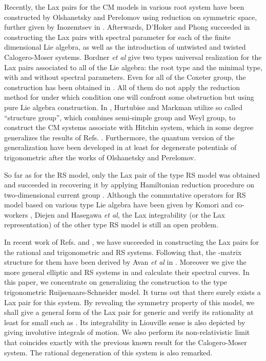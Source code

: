 \documentclass[a4paper,12pt]{article}
\begin{document}
Recently, the Lax pairs for the CM models in various root system have been
constructed by Olshanetsky and Perelomov\cite{op} using reduction on
symmetric space, further given by Inozemtsev in \cite{in}. Afterwards,
D'Hoker and Phong\cite{hp1} succeeded in constructing the Lax pairs with
spectral parameter for each of the finite dimensional Lie algebra, as well
as the introduction of untwisted and twisted Calogero-Moser systems. Bordner
\textit{et al}\cite{bcs,bcs2,bcs3} give two types universal realization for
the Lax pairs associated to all of the Lie algebra: the root type and the
minimal type, with and without spectral parameters. Even for all of the
Coxeter group, the construction has been obtained in \cite{bcs1}. All of
them do not apply the reduction method for under which condition one will
confront some obstruction\cite{hm} but using pure Lie algebra construction.
In \cite{hm}, Hurtubise and Markman utilize so called ``structure group'',
which combines semi-simple group and Weyl group, to construct the CM systems
associate with Hitchin system, which in some degree generalizes the results
of Refs. \cite{hp1,bcs,bcs2,bcs3,bcs1}. Furthermore, the quantum version of
the generalization have been developed in \cite{bms,kps} at least for
degenerate potentials of trigonometric after the works of Olshanetsky and
Perelomov\cite{op1}.

So far as for the RS model, only the Lax pair of the \coordHE{} type RS model
was obtained \cite{r1,nksr,bc,kz,s1,s2} and succeeded in recovering it by
applying Hamiltonian reduction procedure on two-dimensional current group
\cite{aru}. Although the commutative operators for RS model based on various
type Lie algebra have been given by Komori and co-workers \cite{ko1}, Diejen%
\cite{di,di1} and Hasegawa \textit{et al}\cite{h1,h2}, the Lax integrability
(or the Lax representation) of the other type RS model is still an open
problem\cite{bm1}.

In recent work of Refs. \cite{kai3} and \cite{Che00}, we have succeeded in
constructing the Lax pairs for the rational and trigonometric \coordHE{} and \coordHE{} RS systems. Following that, the \coordHE{}-matrix structure for them have been
derived by Avan \textit{et al} in \cite{Avan}. Moreover we give the more
general elliptic \coordHE{} and \coordHE{} RS systems in \cite{Che01} and
calculate their spectral curves. In this paper, we concentrate on
generalizing the construction to the \coordHE{}type trigonometric
Ruijsenaars-Schneider model. It turns out that there surely exists a Lax
pair for this system. By revealing the symmetry property of this model, we
shall give a general form of the Lax pair for generic  \coordHE{} and verify its
rationality at least for small \coordHE{} such as \coordHE{}. Its integrability
in Liouville sense is also depicted by giving \coordHE{} involutive integrals of
motion. We also perform its non-relativistic limit that coincides exactly
with the previous known result for the \coordHE{} Calogero-Moser system. The
rational degeneration of this system is also remarked.
\end{document}

